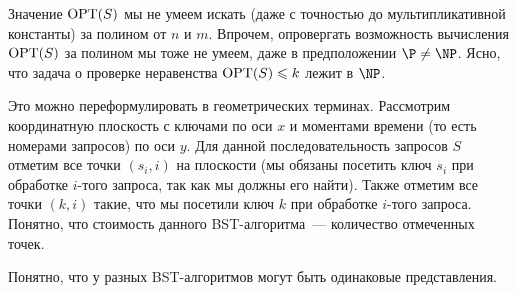 Значение
$\operatorname{OPT}(S)$ мы не умеем искать (даже с точностью до мультипликативной
константы) за полином от $n$ и $m$.
Впрочем, опровергать возможность вычисления $\operatorname{OPT}(S)$
за полином мы тоже не умеем, даже в предположении $\P \neq \NP$. Ясно,
что задача о проверке неравенства $\operatorname{OPT}(S) \leqslant k$ лежит в $\NP$.

Это можно переформулировать в геометрических терминах. Рассмотрим координатную
плоскость с ключами по оси $x$ и моментами времени (то есть номерами запросов) по
оси $y$. Для данной последовательность запросов $S$ отметим все точки $(s_i, i)$
на плоскости (мы обязаны посетить ключ $s_i$ при обработке $i$-того
запроса, так как мы должны его найти). Также отметим все точки $(k, i)$ такие,
что мы посетили ключ $k$ при обработке $i$-того запроса. Понятно, что стоимость данного BST-алгоритма~--- количество отмеченных точек.


\begin{remark}
	Понятно, что у разных BST-алгоритмов могут быть одинаковые представления.
\end{remark}


